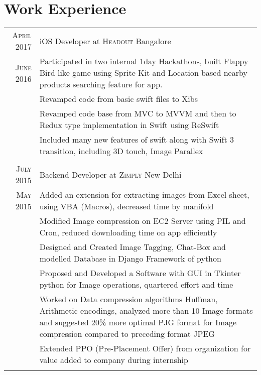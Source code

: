 \documentclass[a4paper,10pt]{article}
\begin{document}
\section{Work Experience}
\begin{tabular}{r|p{16cm}}

\textsc{April 2017} & iOS Developer at \textsc{Headout} Bangalore \\
 \textsc{June 2016} & Participated in two internal 1day Hackathons, built Flappy Bird like game using Sprite Kit and Location based nearby products searching feature for app.\\
& Revamped code from basic swift files to Xibs\\
& Revamped code base from MVC to MVVM and then to Redux type implementation in Swift using ReSwift\\
& Included many new features of swift along with Swift 3 transition, including 3D touch, Image Parallex\\\multicolumn{2}{c}{}\\
 
 \textsc{July 2015} & Backend Developer at \textsc{Zimply} New Delhi \\
 \textsc{May 2015} & Added an extension for extracting images from Excel sheet, using VBA (Macros), decreased time by manifold\\
& Modified Image compression on EC2 Server using PIL and Cron, reduced downloading time on app efficiently\\
& Designed and Created Image Tagging, Chat-Box and modelled Database in Django Framework of python\\
& Proposed and Developed a Software with GUI in Tkinter python for Image operations, quartered effort and time\\
& Worked on Data compression algorithms Huffman, Arithmetic encodings, analyzed more than 10 Image formats and suggested 20\% more optimal PJG format for Image compression compared to preceding format JPEG\\
& Extended PPO (Pre-Placement Offer) from organization for value added to company during internship\\\multicolumn{2}{c}{}\\

\end{tabular}

\end{document}
